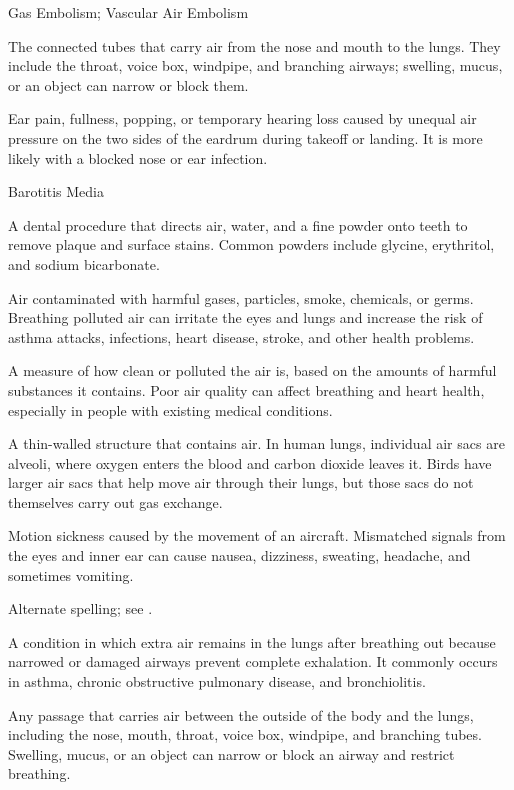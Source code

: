\synonyms
Gas Embolism; Vascular Air Embolism

 The connected tubes that carry air from the nose and mouth to the lungs. They include the throat, voice box, windpipe, and branching airways; swelling, mucus, or an object can narrow or block them.

 Ear pain, fullness, popping, or temporary hearing loss caused by unequal air pressure on the two sides of the eardrum during takeoff or landing. It is more likely with a blocked nose or ear infection.

\synonyms
Barotitis Media

 A dental procedure that directs air, water, and a fine powder onto teeth to remove plaque and surface stains. Common powders include glycine, erythritol, and sodium bicarbonate.

 Air contaminated with harmful gases, particles, smoke, chemicals, or germs. Breathing polluted air can irritate the eyes and lungs and increase the risk of asthma attacks, infections, heart disease, stroke, and other health problems.

 A measure of how clean or polluted the air is, based on the amounts of harmful substances it contains. Poor air quality can affect breathing and heart health, especially in people with existing medical conditions.

 A thin-walled structure that contains air. In human lungs, individual air sacs are alveoli,
where oxygen enters the blood and carbon dioxide leaves it.
Birds have larger air sacs that help move air through their lungs,
but those sacs do not themselves carry out gas exchange.

 Motion sickness caused by the movement of an aircraft. Mismatched signals from the eyes and inner ear can cause nausea, dizziness, sweating, headache, and sometimes vomiting.

 Alternate spelling; see .

 A condition in which extra air remains in the lungs after breathing out because narrowed or damaged airways prevent complete exhalation. It commonly occurs in asthma, chronic obstructive pulmonary disease, and bronchiolitis.

 Any passage that carries air between the outside of the body and the lungs, including the nose, mouth, throat, voice box, windpipe, and branching tubes. Swelling, mucus, or an object can narrow or block an airway and restrict breathing.


